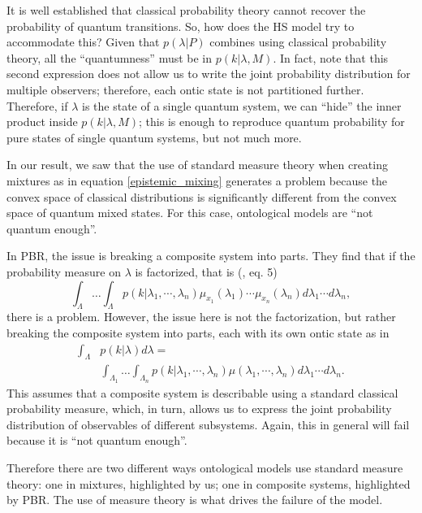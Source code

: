 \documentclass[10pt,twocolumn, nofootinbib]{revtex4-2}
\begin{document}
It is well established that classical probability theory cannot recover the probability of quantum transitions. So, how does the HS model try to accommodate this? Given that $p(\lambda|P)$ combines using classical probability theory, all the ``quantumness'' must be in $p(k|\lambda, M)$. In fact, note that this second expression does not allow us to write the joint probability distribution for multiple observers; therefore, each ontic state is not partitioned further. Therefore, if $\lambda$ is the state of a single quantum system, we can ``hide'' the inner product inside $p(k|\lambda, M)$; this is enough to reproduce quantum probability for pure states of single quantum systems, but not much more.

In our result, we saw that the use of standard measure theory when creating mixtures as in equation \ref{epistemic_mixing} generates a problem because the convex space of classical distributions is significantly different from the convex space of quantum mixed states. For this case, ontological models are ``not quantum enough''.

In PBR, the issue is breaking a composite system into parts. They find  that if the probability measure on $\lambda$ is factorized, that is (\cite{PBR:2012}, eq. 5) 
\begin{equation}
	\int_{\Lambda} \dots \int_{\Lambda} p(k | \lambda_1, \cdots, \lambda_n) \mu_{x_1}(\lambda_1)\cdots\mu_{x_n}(\lambda_n) d\lambda_1 \cdots d\lambda_n ,
\end{equation}
there is a problem. However, the issue here is not the factorization, but rather breaking the composite system into parts, each with its own ontic state as in 
\begin{equation}
	\begin{aligned}
	\int_\Lambda &p(k | \lambda) d\lambda = \\
	&\int_{\Lambda_1} \dots \int_{\Lambda_n} p(k | \lambda_1, \cdots, \lambda_n) \mu(\lambda_1, \cdots, \lambda_n) d\lambda_1 \cdots d\lambda_n.
	\end{aligned}
\end{equation}
This assumes that a composite system is describable using a standard classical probability measure, which, in turn, allows us to express the joint probability distribution of observables of different subsystems. Again, this in general will fail because it is ``not quantum enough''.

Therefore there are two different ways ontological models use standard measure theory: one in mixtures, highlighted by us; one in composite systems, highlighted by PBR. The use of measure theory is what drives the failure of the model.
\end{document}
